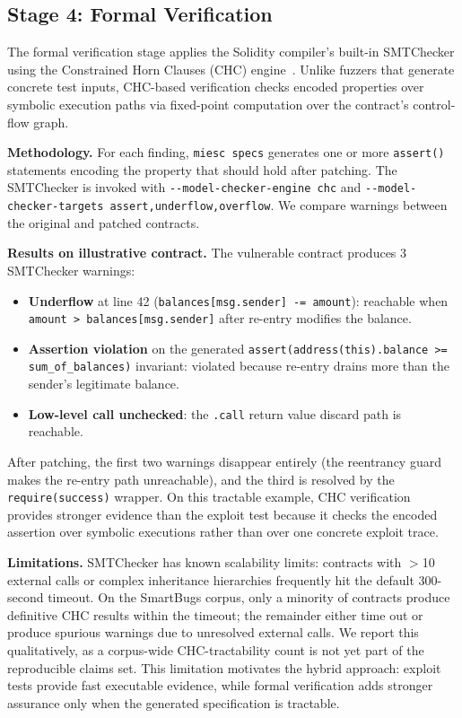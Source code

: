 \documentclass[conference]{IEEEtran}
\begin{document}
\subsection{Stage 4: Formal Verification}

The formal verification stage applies the Solidity compiler's built-in SMTChecker using the Constrained Horn Clauses (CHC) engine~\cite{halmos2023}. Unlike fuzzers that generate concrete test inputs, CHC-based verification checks encoded properties over symbolic execution paths via fixed-point computation over the contract's control-flow graph.

\textbf{Methodology.} For each finding, \texttt{miesc specs} generates one or more \texttt{assert()} statements encoding the property that should hold after patching. The SMTChecker is invoked with \texttt{-{}-model-checker-engine chc} and \texttt{-{}-model-checker-targets assert,underflow,overflow}. We compare warnings between the original and patched contracts.

\textbf{Results on illustrative contract.} The vulnerable contract produces 3 SMTChecker warnings:
\begin{itemize}
    \item \textbf{Underflow} at line 42 (\texttt{balances[msg.sender] -= amount}): reachable when \texttt{amount > balances[msg.sender]} after re-entry modifies the balance.
    \item \textbf{Assertion violation} on the generated \texttt{assert(address(this).balance >= sum\_of\_balances)} invariant: violated because re-entry drains more than the sender's legitimate balance.
    \item \textbf{Low-level call unchecked}: the \texttt{.call} return value discard path is reachable.
\end{itemize}

After patching, the first two warnings disappear entirely (the reentrancy guard makes the re-entry path unreachable), and the third is resolved by the \texttt{require(success)} wrapper. On this tractable example, CHC verification provides stronger evidence than the exploit test because it checks the encoded assertion over symbolic executions rather than over one concrete exploit trace.

\textbf{Limitations.} SMTChecker has known scalability limits: contracts with $>$10 external calls or complex inheritance hierarchies frequently hit the default 300-second timeout. On the SmartBugs corpus, only a minority of contracts produce definitive CHC results within the timeout; the remainder either time out or produce spurious warnings due to unresolved external calls. We report this qualitatively, as a corpus-wide CHC-tractability count is not yet part of the reproducible claims set. This limitation motivates the hybrid approach: exploit tests provide fast executable evidence, while formal verification adds stronger assurance only when the generated specification is tractable.
\end{document}
